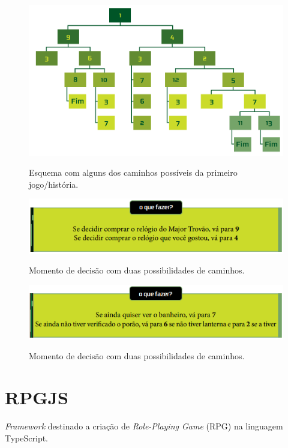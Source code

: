         \begin{figure}
            \centering
            \caption{Esquema com alguns dos caminhos possíveis da primeiro jogo/história.}
            \includegraphics[scale=0.3]{Textuais/Pictures/Picture1.png}
            \label{fig:figure-1}
        \end{figure}
        \begin{figure}
            \centering
            \caption{Momento de decisão com duas possibilidades de caminhos.}
            \includegraphics[scale=1]{Textuais/Pictures/Picture2.png}
            \label{fig:figure-2}
        \end{figure}
        \begin{figure}
            \centering
            \caption{Momento de decisão com duas possibilidades de caminhos.}
            \includegraphics[scale=1]{Textuais/Pictures/Picture3.png}
            \label{fig:figure-3}
        \end{figure}

    \section{RPGJS}
        \textit{Framework} destinado a criação de \textit{Role-Playing Game} (RPG) na linguagem TypeScript.